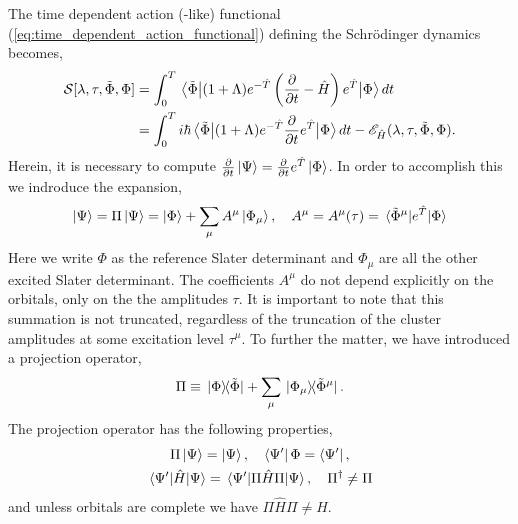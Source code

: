 The time dependent action (-like) functional (\autoref{eq:time_dependent_action_functional}) 
defining the Schrödinger dynamics becomes,
\begin{equation}
    \begin{aligned}
        \label{eq:oatdcc_functional}
        \mathcal{S}[\lambda, \tau, \tilde{\Phi}, \Phi]
        &= \int_0^T \mel{\tilde{\Phi}}
            {(1 + \Lambda)e^{-\hat{T}}\left(\frac{\partial}{\partial t} - \hat{H} \right)e^{\hat{T}}} 
            {\Phi} dt \\ 
        &= \int_0^T i\hbar\mel{\tilde{\Phi}}
        {(1 + \Lambda)e^{-\hat{T}}\frac{\partial}{\partial t}e^{\hat{T}}}
        {\Phi} dt
        - \mathscr{E}_{\hat{H}}(\lambda, \tau, \tilde{\Phi}, \Phi).
    \end{aligned} 
\end{equation}
Herein, it is necessary to compute 
$\frac{\partial}{\partial t}\ket{\Psi} = \frac{\partial}{\partial t}e^{\hat{T}}\ket{\Phi}$.
In order to accomplish this we indroduce the expansion,
\begin{equation}
    \ket{\Psi} = \Pi\ket{\Psi} = \ket{\Phi} + \sum_\mu A^\mu \ket{\Phi_\mu}, \quad
    A^\mu = A^\mu(\tau) = \mel*{\tilde{\Phi}^\mu}{e^{\hat{T}}}{\Phi}
\end{equation}
Here we write $\Phi$ as the reference Slater determinant and $\Phi_\mu$ are all the other 
excited Slater determinant. The coefficients $A^\mu$ do not depend explicitly on the 
orbitals, only on the the amplitudes $\tau$. It is important to note that this summation is not truncated,
regardless of the truncation of the cluster amplitudes at some excitation level $\tau^\mu$.
To further the matter, we have introduced a projection operator,
\begin{equation}
    \Pi \equiv \outerproduct*{\Phi}{\tilde{\Phi}} 
    + \sum_\mu \outerproduct*{\Phi_\mu}{\tilde{\Phi}^\mu}.
\end{equation}
The projection operator has the following properties,
\begin{equation}
    \begin{gathered}
        \Pi \ket{\Psi} = \ket{\Psi}, \quad \bra{\Psi'}\Phi = \bra{\Psi'}, \\
        \mel{\Psi'}{\hat{H}}{\Psi} = \mel{\Psi'}{\Pi\hat{H}\Pi}{\Psi},
        \quad \Pi^\dagger \neq \Pi
    \end{gathered}
\end{equation}
and unless orbitals are complete we have $\Pi\hat{H}\Pi \neq \hat{H}$.

